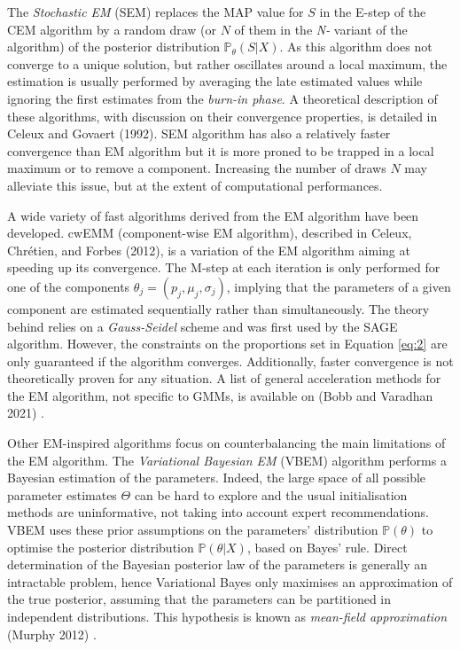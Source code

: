 The \emph{Stochastic EM} (SEM) replaces the MAP value for \(S\) in the E-step
of the CEM algorithm by a random draw (or \(N\) of them in the \emph{N-}
variant of the algorithm) of the posterior distribution
\(\mathbb{P}_\theta (S|X)\). As this algorithm does not converge to a
unique solution, but rather oscillates around a local maximum, the
estimation is usually performed by averaging the late estimated values
while ignoring the first estimates from the \emph{burn-in phase}. A
theoretical description of these algorithms, with discussion on their
convergence properties, is detailed in Celeux and Govaert (1992). SEM algorithm
has also a relatively faster convergence than EM algorithm but it is
more proned to be trapped in a local maximum or to remove a component.
Increasing the number of draws \(N\) may alleviate this issue, but at the
extent of computational performances.

A wide variety of fast algorithms derived from the EM algorithm have
been developed. cwEMM (component-wise EM algorithm), described in
Celeux, Chrétien, and Forbes (2012), is a variation of the EM algorithm aiming at speeding up
its convergence. The M-step at each iteration is only performed for one
of the components \(\theta_j=(p_j, \mu_j, \sigma_j)\), implying that the
parameters of a given component are estimated sequentially rather than
simultaneously. The theory behind relies on a \emph{Gauss-Seidel} scheme and
was first used by the SAGE algorithm. However, the constraints on the
proportions set in Equation \eqref{eq:2} are only guaranteed if the
algorithm converges. Additionally, faster convergence is not
theoretically proven for any situation. A list of general acceleration
methods for the EM algorithm, not specific to GMMs, is available on
 (Bobb and Varadhan 2021) .

Other EM-inspired algorithms focus on counterbalancing the main
limitations of the EM algorithm. The \emph{Variational Bayesian EM} (VBEM)
algorithm performs a Bayesian estimation of the parameters. Indeed, the
large space of all possible parameter estimates \(\Theta\) can be hard to
explore and the usual initialisation methods are uninformative, not
taking into account expert recommendations. VBEM uses these prior
assumptions on the parameters' distribution \(\mathbb{P} (\theta)\) to
optimise the posterior distribution \(\mathbb{P} (\theta|X)\), based on
Bayes' rule. Direct determination of the Bayesian posterior law of the
parameters is generally an intractable problem, hence Variational Bayes
only maximises an approximation of the true posterior, assuming that the
parameters can be partitioned in independent distributions. This
hypothesis is known as \emph{mean-field approximation} (Murphy 2012) .

